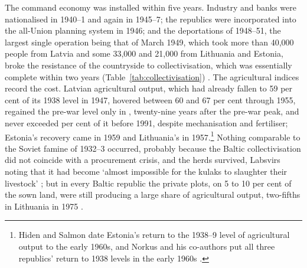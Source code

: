 The command economy was installed within five years. Industry and banks were nationalised in 1940--1 and again in 1945--7; the republics were incorporated into the all-Union planning system in 1946; and the deportations of 1948--51, the largest single operation being that of March 1949, which took more than 40,000 people from Latvia and some 33,000 and 21,000 from Lithuania and Estonia, broke the resistance of the countryside to collectivisation, which was essentially complete within two years (Table~\ref{tab:collectivisation}) \parencites[183]{krumins_2017_tautsaimnieciba_1940}[99--100]{feest2014}[102--3, 108]{years_of_dependence}. The agricultural indices record the cost. Latvian agricultural output, which had already fallen to 59 per cent of its 1938 level in 1947, hovered between 60 and 67 per cent through 1955, regained the pre-war level only in , twenty-nine years after the pre-war peak, and never exceeded \primPEAKidx{} per cent of it before 1991, despite mechanisation and fertiliser; Estonia's recovery came in 1959 and Lithuania's in 1957.\footnote{Hiden and Salmon date Estonia's return to the 1938--9 level of agricultural output to the early 1960s, and Norkus and his co-authors put all three republics' return to 1938 levels in the early 1960s \parencites[131]{hiden_salmon}[15]{norkus_2025_denmarkisation}.} Nothing comparable to the Soviet famine of 1932--3 occurred, probably because the Baltic collectivisation did not coincide with a procurement crisis, and the herds survived, Labsvirs noting that it had become `almost impossible for the kulaks to slaughter their livestock' \parencite[92]{labsvirs_1959_case}; but in every Baltic republic the private plots, on 5 to 10 per cent of the sown land, were still producing a large share of agricultural output, two-fifths in Lithuania in 1975 \parencites[268--9]{labsvirs_1959_case}[191, 231--2]{years_of_dependence}.



